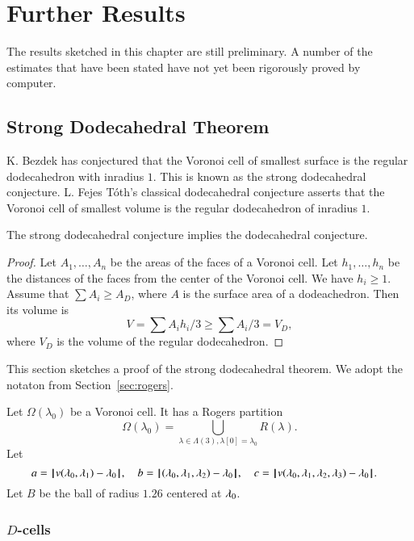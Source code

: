 
\chapter{Further Results}

\begin{note}%
The results sketched in this chapter are still preliminary.  A number of the estimates that have been stated have not yet been rigorously proved by computer. 
\end{note}

\section{Strong Dodecahedral Theorem}

K. Bezdek has conjectured that the Voronoi cell of smallest surface is the regular dodecahedron with inradius $1$.  This is known as the strong dodecahedral conjecture.  L. Fejes T\'oth's classical dodecahedral conjecture asserts that the Voronoi cell of smallest volume is the regular dodecahedron of inradius $1$.

\begin{lemma}  The strong dodecahedral conjecture implies the dodecahedral conjecture.
\end{lemma}

\begin{proof}  Let $A_1,\ldots,A_n$ be the areas of the faces of a Voronoi cell.  Let $h_1,\ldots,h_n$ be the distances of the faces from the center of the Voronoi cell.  We have $h_i\ge 1$.  Assume that $\sum A_i \ge A_D$, where $A$ is the surface area of a dodeachedron.  Then its volume is
$$
V = \sum A_i h_i/3 \ge \sum A_i/3 = V_D,
$$
where $V_D$ is the volume of the regular dodecahedron.
\end{proof}

This section sketches a proof of the strong dodecahedral theorem.  We adopt the notaton from Section~\ref{sec:rogers}.

Let $\Omega(\lambda_0)$ be a Voronoi cell.    It has a Rogers partition
$$
\Omega(\lambda_0) = \bigcup_{\lambda\in \Lambda(3),\lambda[0]=\lambda_0 } R(\lambda).
$$
Let 
$$
a = {\hskip0.1em|\hskip-0.15em|\hskip0.1em} v(\lambda_0,\lambda_1) -   \lambda_0{\hskip0.1em|\hskip-0.15em|\hskip0.1em},\quad
b = {\hskip0.1em|\hskip-0.15em|\hskip0.1em}(\lambda_0,\lambda_1,\lambda_2) -  \lambda_0{\hskip0.1em|\hskip-0.15em|\hskip0.1em},\quad
c = {\hskip0.1em|\hskip-0.15em|\hskip0.1em} v(\lambda_0,\lambda_1,\lambda_2,\lambda_3) -   \lambda_0{\hskip0.1em|\hskip-0.15em|\hskip0.1em}.\quad
$$
Let $B$ be the ball of radius $1.26$ centered at $\lambda_0$.

\subsection{$D$-cells}

